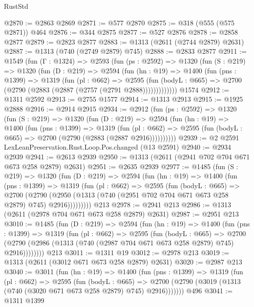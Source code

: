 \begin{lexlean}{RustStd}
\begin{coremodule}
@2870 := @2863 @2869
@2871 := @577 @2870
@2875 := @318 (@555 (@575 @2871)) @464
@2876 := @344 @2875
@2877 := @527 @2876
@2878 := @2858 @2877
@2879 := @2823 @2877
@2883 := @1313 (@2611 (@2744 @2879) @2631)
@2887 := @1313 (@740 (@2749 @2879) @745)
@2888 := @2833 @2877
@2911 := @1549
    (fun (Γ : @1324) =>
    @2593
      (fun (ps : @2592) =>
      @1320
        (fun (S : @219) =>
        @1320
          (fun (D : @219) =>
          @2594
            (fun (hn : @19) =>
            @1400
              (fun (pns : @1399) =>
              @1319
                (fun (pl : @662) =>
                @2595
                  (fun (bodyL : @665) => @2700 (@2790 (@2883 (@2887 (@2757 (@2791 @2888)))))))))))))
    @1574
@2912 := @1311 @2592
@2913 := @2755 @1577
@2914 := @1313 @2913
@2915 := @1925 @2888
@2916 := @2914 @2915
@2934 := @2912
    (fun (ps : @2592) =>
    @1320
      (fun (S : @219) =>
      @1320
        (fun (D : @219) =>
        @2594
          (fun (hn : @19) =>
          @1400
            (fun (pns : @1399) =>
            @1319
              (fun (pl : @662) =>
              @2595 (fun (bodyL : @665) => @2700 (@2790 (@2883 (@2887 @2916))))))))))
@2939 := @2 @2591 LexLeanPreservation.Rust.Loop.Pos.changed (@13 @2591)
@2940 := @2934 @2939
@2941 := @2613 @2939
@2950 := @1313 (@2611 (@2941 @702 @704 @671 @673 @258 @2879) @2631)
@2951 := @2635 @2939
@2977 := @1485
    (fun (S : @219) =>
    @1320
      (fun (D : @219) =>
      @2594
        (fun (hn : @19) =>
        @1400
          (fun (pns : @1399) =>
          @1319
            (fun (pl : @662) =>
            @2595
              (fun (bodyL : @665) =>
              @2700
                (@2790
                  (@2950 (@1313 (@740 (@2951 @702 @704 @671 @673 @258 @2879) @745) @2916)))))))))
    @213
@2978 := @2941 @213
@2986 := @1313 (@2611 (@2978 @704 @671 @673 @258 @2879) @2631)
@2987 := @2951 @213
@3010 := @1485
    (fun (D : @219) =>
    @2594
      (fun (hn : @19) =>
      @1400
        (fun (pns : @1399) =>
        @1319
          (fun (pl : @662) =>
          @2595
            (fun (bodyL : @665) =>
            @2700 (@2790 (@2986 (@1313 (@740 (@2987 @704 @671 @673 @258 @2879) @745) @2916))))))))
    @213
@3011 := @1311 @19
@3012 := @2978 @213
@3019 := @1313 (@2611 (@3012 @671 @673 @258 @2879) @2631)
@3020 := @2987 @213
@3040 := @3011
    (fun (hn : @19) =>
    @1400
      (fun (pns : @1399) =>
      @1319
        (fun (pl : @662) =>
        @2595
          (fun (bodyL : @665) =>
          @2700 (@2790 (@3019 (@1313 (@740 (@3020 @671 @673 @258 @2879) @745) @2916)))))))
    @496
@3041 := @1311 @1399

\end{coremodule}
\end{lexlean}
